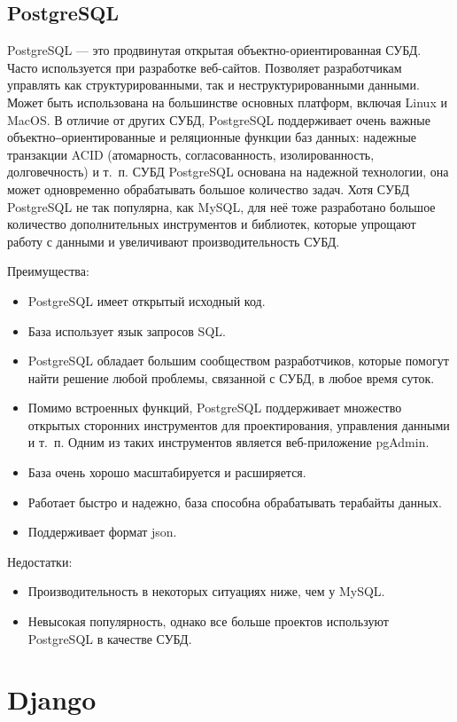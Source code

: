 \subsection{PostgreSQL}

PostgreSQL — это продвинутая открытая объектно-ориентированная СУБД.
Часто используется при разработке веб-сайтов.
Позволяет разработчикам управлять как структурированными, так и неструктурированными данными.
Может быть использована на большинстве основных платформ, включая Linux и MacOS.
В отличие от других СУБД, PostgreSQL поддерживает очень важные объектно‒ориентированные и реляционные функции баз данных: надежные транзакции ACID (атомарность, согласованность, изолированность, долговечность) и т.~п.
СУБД PostgreSQL основана на надежной технологии, она может одновременно обрабатывать большое количество задач.
Хотя СУБД PostgreSQL не так популярна, как MySQL, для неё тоже разработано большое количество дополнительных инструментов и библиотек, которые упрощают работу с данными и увеличивают производительность СУБД.

Преимущества:
\begin{itemize}
	\item PostgreSQL имеет открытый исходный код.
	\item База использует язык запросов SQL.
	\item PostgreSQL обладает большим сообществом разработчиков, которые помогут найти решение любой проблемы, связанной с СУБД, в любое время суток.
	\item Помимо встроенных функций, PostgreSQL поддерживает множество открытых сторонних инструментов для проектирования, управления данными и т.~п. Одним из таких инструментов является веб-приложение pgAdmin.
	\item База очень хорошо масштабируется и расширяется.
	\item Работает быстро и надежно, база способна обрабатывать терабайты данных.
	\item Поддерживает формат json.
\end{itemize}

Недостатки:
\begin{itemize}
	\item Производительность в некоторых ситуациях ниже, чем у MySQL.
	\item Невысокая популярность, однако все больше проектов используют PostgreSQL в качестве СУБД.
\end{itemize}

\section{Django}

